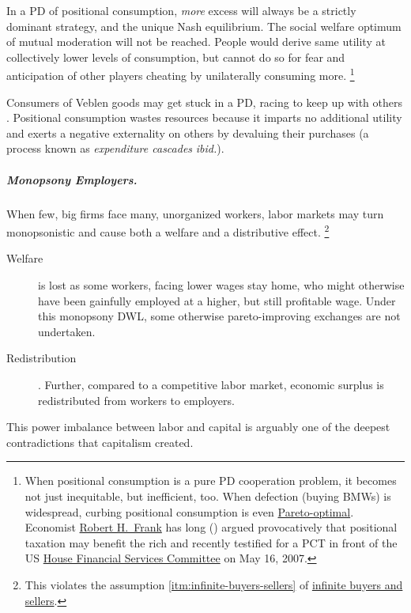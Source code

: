 In a \gls{PD} of positional consumption, \emph{more} excess will always be a strictly dominant strategy, and the unique Nash equilibrium.
The social welfare optimum of mutual moderation will not be reached.
People would derive same utility at collectively lower levels of consumption, but cannot do so for fear and anticipation of other players cheating by unilaterally consuming more.
\footnote{
	When positional consumption is a pure \gls{PD} cooperation problem, it becomes not just inequitable, but inefficient, too.
	When defection (buying BMWs) is widespread, curbing positional consumption is even \hyperref[sec:Pareto]{Pareto-optimal}.
	Economist \hyperref[http://www.robert-h-frank.com]{Robert H.~Frank} has long (\citeyear{Frank1987}) argued provocatively that positional taxation may benefit the rich and recently testified for a \gls{PCT} in front of the US \hyperref[http://financialservices.house.gov/]{House Financial Services Committee} on May 16, 2007.
}

Consumers of Veblen goods may get stuck in a \gls{PD}, racing to keep up with others \citep{Frank1987}.
Positional consumption wastes resources because it imparts no additional utility and exerts a negative externality on others by devaluing their purchases (a process known as \emph{expenditure cascades} \emph{ibid.}).

\subparagraph[Monopsony Employers]{Monopsony Employers.}
	\label{sec:monopsony-employers}
When few, big firms face many, unorganized workers, labor markets may turn monopsonistic and cause both a welfare and a distributive effect.
\footnote{
	This violates the  assumption \ref{itm:infinite-buyers-sellers} of \hyperref[itm:infinite-buyers-sellers]{infinite buyers and sellers}.
}
\begin{description}
	\item[Welfare] is lost as some workers, facing lower wages stay home, who might otherwise have been gainfully employed at a higher, but still profitable wage.
	Under this monopsony \gls{DWL}, some otherwise pareto-improving exchanges are not undertaken.

	\item[Redistribution].
	Further, compared to a competitive labor market, economic surplus is redistributed from workers to employers.
\end{description}

This power imbalance between labor and capital is arguably one of the deepest contradictions that capitalism created.

